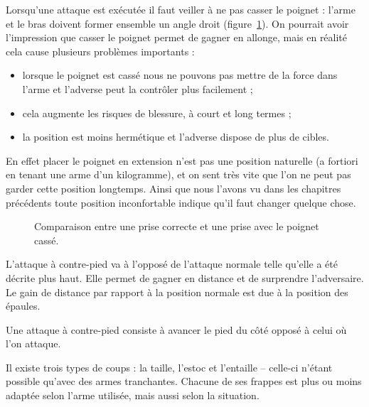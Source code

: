 Lorsqu'une attaque est exécutée il faut veiller à ne pas casser le poignet : l'arme et le bras doivent former ensemble un angle droit (figure~\ref{attdef:fig:poignet-cassé}).
On pourrait avoir l'impression que casser le poignet permet de gagner en allonge, mais en réalité cela cause plusieurs problèmes importants :
\begin{itemize}
	\item lorsque le poignet est cassé nous ne pouvons pas mettre de la force dans l'arme et l'adverse peut la contrôler plus facilement ;
	
	\item cela augmente les risques de blessure, à court et long termes ;
	
	\item la position est moins hermétique et l'adverse dispose de plus de cibles.
\end{itemize}
En effet placer le poignet en extension n'est pas une position naturelle (a fortiori en tenant une arme d'un kilogramme), et on sent très vite que l'on ne peut pas garder cette position longtemps.
Ainsi que nous l'avons vu dans les chapitres précédents toute position inconfortable indique qu'il faut changer quelque chose.


\begin{figure}[ht]
	\centering
	\hspace{3cm}
	\caption{Comparaison entre une prise correcte et une prise avec le poignet cassé.}
	\label{attdef:fig:poignet-cassé}
\end{figure}


L'attaque à contre-pied va à l'opposé de l'attaque normale telle qu'elle a été décrite plus haut.
Elle permet de gagner en distance et de surprendre l'adversaire.
Le gain de distance par rapport à la position normale est due à la position des épaules.

\begin{coup}
\label{struct:coup:contre-pied}

Une attaque à contre-pied consiste à avancer le pied du côté opposé à celui où l'on attaque.
\end{coup}


Il existe trois types de coups : la taille, l'estoc et l'entaille -- celle-ci n'étant possible qu'avec des armes tranchantes.
Chacune de ses frappes est plus ou moins adaptée selon l'arme utilisée, mais aussi selon la situation.


